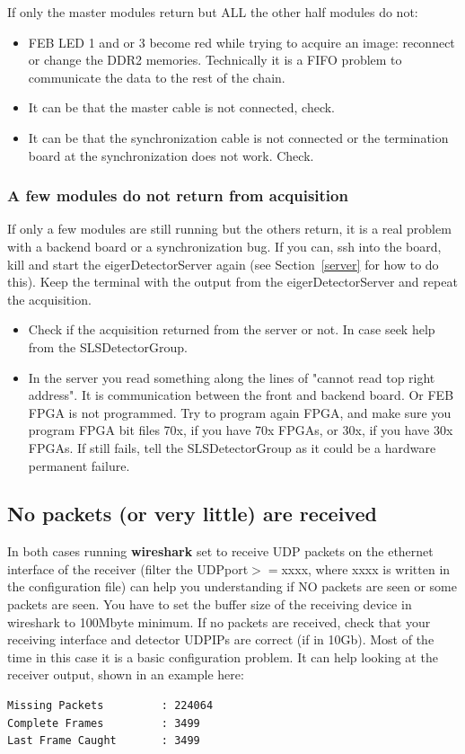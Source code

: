 \documentclass{article}
\begin{document}
If only the master modules return but ALL the other half modules do not: 
\begin{itemize}
\item FEB LED 1 and or 3 become red while trying to acquire an image: reconnect or change the DDR2 memories. Technically it is a FIFO problem to communicate the data to the rest of the chain. 
\item It can be that the master cable is not connected, check.
\item It can be that the synchronization cable is not connected or the termination board at the synchronization does not work. Check.
\end{itemize}

\subsubsection{A few modules do not return from acquisition}
If only a few modules are still running but the others return, it is a real problem with a backend board or a synchronization bug.
If you can, ssh into the board, kill and start the eigerDetectorServer again (see Section~\ref{server} for how to do this). Keep the terminal with the output from the  eigerDetectorServer and repeat the acquisition. 
\begin{itemize}
\item Check if the acquisition returned from the server or not. In case seek help from the SLSDetectorGroup.
\item In the server you read something along the lines of "cannot read top right address". It is communication between the front and backend board. Or FEB FPGA is not programmed. Try to program again FPGA, and make sure you program FPGA bit files 70x, if you have 70x FPGAs, or 30x, if you have 30x FPGAs. If still fails, tell the SLSDetectorGroup as it could be a hardware permanent failure.
\end{itemize}

\subsection{No packets (or very little) are received} 
In both cases running \textbf{wireshark} set to receive UDP packets on the ethernet interface of the receiver (filter the UDPport$>=$xxxx, where xxxx is written in the configuration file) can help you understanding if NO packets are seen or some packets are seen. You have to set the buffer size of the receiving device in wireshark to 100Mbyte minimum. If no packets are received, check that your receiving interface and detector UDPIPs are correct (if in 10Gb). Most of the time in this case it is a basic configuration problem.
It can help looking at the receiver output, shown in an example here:
\begin{verbatim}
Missing Packets         : 224064
Complete Frames         : 3499
Last Frame Caught       : 3499
\end{verbatim}
\end{document}
